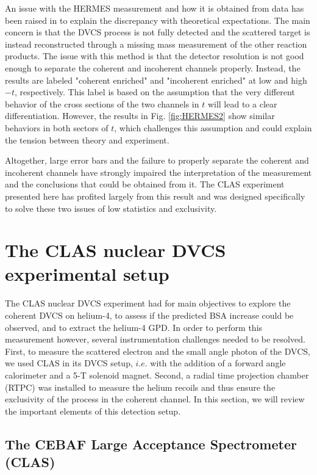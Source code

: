 \documentclass{article}
\begin{document}
An issue with the HERMES measurement and how it is obtained from data has been raised in
\cite{Guzey:2003jh} to explain the discrepancy with theoretical expectations.
The main concern is that the DVCS process is not fully detected and the scattered target
is instead reconstructed through a missing mass measurement of the other reaction products. The 
issue with this method is that the detector resolution is not good enough to separate the 
coherent and incoherent channels properly. 
Instead, the results are labeled "coherent enriched" and "incoherent enriched" at low and high 
$-t$, respectively. This label is based on the assumption that the very different behavior of the
cross sections of the two channels in $t$ will lead to a clear differentiation. However, the
results in Fig. \ref{fig:HERMES2} show similar behaviors in both sectors of $t$, which  
challenges this assumption and could explain the tension between theory and experiment. 

Altogether, large error bars and the failure to properly separate the coherent and 
incoherent channels have strongly impaired the interpretation of the measurement 
and the conclusions that could be
obtained from it. The CLAS experiment presented here has profited largely from this
result and was designed specifically to solve these two issues of low statistics and exclusivity.

\section{The CLAS nuclear DVCS experimental setup}

The CLAS nuclear DVCS experiment had for main objectives to explore the coherent DVCS on helium-4, to assess if
the predicted BSA increase could be observed, and to extract the helium-4 GPD. In order to
perform this measurement however, several instrumentation challenges needed to be resolved. First, to
measure the scattered electron and the small angle photon of the DVCS, we used CLAS in its 
DVCS setup, $i.e.$ with the addition of a forward angle calorimeter and a 5-T solenoid magnet. Second, a
radial time projection chamber (RTPC) was installed to measure the
helium recoils and thus ensure the exclusivity of the process in the coherent channel. In this section, we 
will review the important elements of this detection setup. 

\subsection{The CEBAF Large Acceptance Spectrometer (CLAS)}
\end{document}
